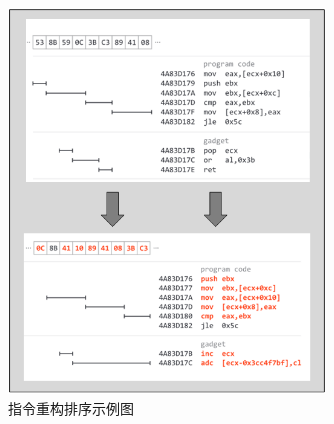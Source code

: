 \begin{enumerate}


\begin{figure}[hbt]
	\centering
	\includegraphics[width=0.75\textwidth]{figures/4.3}
	\caption{指令重构排序示例图}\label{fig:4.3}
\end{figure}


\end{enumerate}
